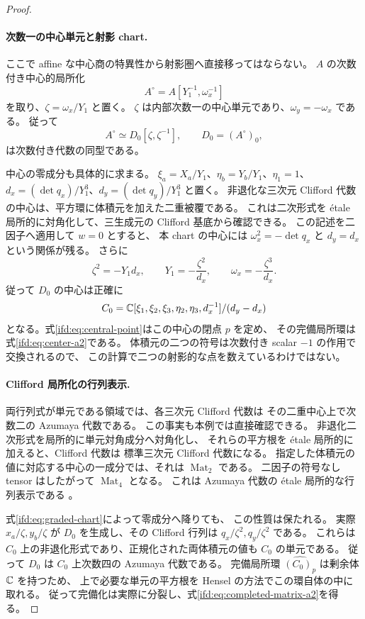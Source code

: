 \begin{proof}
\paragraph{次数一の中心単元と射影 chart.}
ここで affine な中心商の特異性から射影圏へ直接移ってはならない。
$A$ の次数付き中心的局所化
\[
        A^\circ=A[Y_1^{-1},\omega_x^{-1}]
\]
を取り、$\zeta=\omega_x/Y_1$ と置く。
$\zeta$ は内部次数一の中心単元であり、$\omega_y=-\omega_x$ である。
従って
\begin{equation}\label{ifd:eq:graded-chart}
        A^\circ\simeq D_0[\zeta,\zeta^{-1}],
        \qquad D_0=(A^\circ)_0,
\end{equation}
は次数付き代数の同型である。

中心の零成分も具体的に求まる。
$\xi_a=X_a/Y_1$、$\eta_b=Y_b/Y_1$、$\eta_1=1$、
$d_x=(\det q_x)/Y_1^3$、$d_y=(\det q_y)/Y_1^3$ と置く。
非退化な三次元 Clifford 代数の中心は、平方環に体積元を加えた二重被覆である。
これは二次形式を \'etale 局所的に対角化して、三生成元の Clifford 基底から確認できる。
この記述を二因子へ適用して $w=0$ とすると、
本 chart の中心には $\omega_x^2=-\det q_x$ と $d_y=d_x$ という関係が残る。
さらに
\[
       \zeta^2=-Y_1d_x,\qquad
       Y_1=-\frac{\zeta^2}{d_x},\qquad
       \omega_x=-\frac{\zeta^3}{d_x}.
\]
従って $D_0$ の中心は正確に
\begin{equation}\label{ifd:eq:center-chart}
 C_0=\mathbb C[\xi_1,\xi_2,\xi_3,\eta_2,\eta_3,d_x^{-1}]/(d_y-d_x)
\end{equation}
となる。式\eqref{ifd:eq:central-point}はこの中心の閉点 $p$ を定め、
その完備局所環は式\eqref{ifd:eq:center-a2}である。
体積元の二つの符号は次数付き scalar $-1$ の作用で交換されるので、
この計算で二つの射影的な点を数えているわけではない。

\paragraph{Clifford 局所化の行列表示.}
両行列式が単元である領域では、各三次元 Clifford 代数は
その二重中心上で次数二の Azumaya 代数である。
この事実も本例では直接確認できる。
非退化二次形式を局所的に単元対角成分へ対角化し、
それらの平方根を \'etale 局所的に加えると、Clifford 代数は
標準三次元 Clifford 代数になる。
指定した体積元の値に対応する中心の一成分では、それは
$\operatorname{Mat}_2$ である。
二因子の符号なし tensor はしたがって $\operatorname{Mat}_4$ となる。
これは Azumaya 代数の \'etale 局所的な行列表示である
\cite[Tag~0A2J]{CMOStacksNode}。

式\eqref{ifd:eq:graded-chart}によって零成分へ降りても、
この性質は保たれる。
実際 $x_a/\zeta,y_b/\zeta$ が $D_0$ を生成し、その Clifford 行列は
$q_x/\zeta^2,q_y/\zeta^2$ である。
これらは $C_0$ 上の非退化形式であり、正規化された両体積元の値も
$C_0$ の単元である。
従って $D_0$ は $C_0$ 上次数四の Azumaya 代数である。
完備局所環 $\widehat{(C_0)_p}$ は剰余体 $\mathbb C$ を持つため、
上で必要な単元の平方根を Hensel の方法でこの環自体の中に取れる。
従って完備化は実際に分裂し、式\eqref{ifd:eq:completed-matrix-a2}を得る。


\end{proof}
